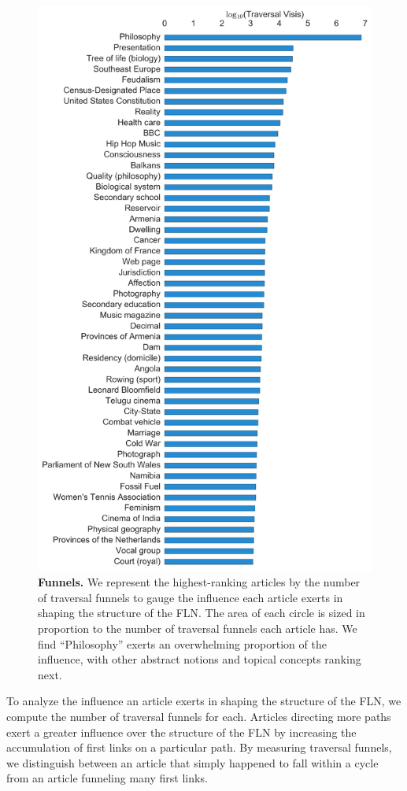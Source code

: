 \documentclass[11pt]{report}
\begin{document}
\begin{figure}[tp!]
  \includegraphics[width=\columnwidth]{graphics/top_funnels.png}
  \caption{
    \textbf{Funnels.}
We represent the highest-ranking articles by the number of traversal 
funnels to gauge the influence each article exerts in shaping the 
structure of the FLN. 
The area of each circle is sized in proportion to the number of 
traversal funnels each article has. 
We find ``Philosophy'' exerts an overwhelming proportion
of the influence, with other abstract notions and topical concepts ranking
next.}
  \label{fig:Funnels}
\end{figure}
To analyze the influence an article exerts in shaping the 
structure of the FLN, we compute the number of traversal funnels for each.
Articles directing more paths exert a greater influence over the structure
of the FLN by increasing the accumulation of first links
on a particular path. By measuring traversal funnels, we distinguish between an article that simply happened to fall within a cycle from an article funneling 
many first links.
\end{document}
